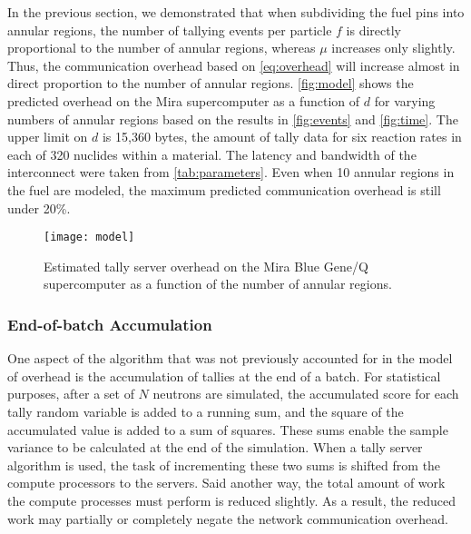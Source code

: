 \documentclass{snamc2013}
\begin{document}
In the previous section, we demonstrated that when subdividing the fuel pins
into annular regions, the number of tallying events per particle $f$ is directly
proportional to the number of annular regions, whereas $\mu$ increases only
slightly. Thus, the communication overhead based on \eqref{eq:overhead} will
increase almost in direct proportion to the number of annular
regions. \autoref{fig:model} shows the predicted overhead on the Mira
supercomputer as a function of $d$ for varying numbers of annular regions based
on the results in \autoref{fig:events} and \autoref{fig:time}. The upper limit
on $d$ is 15,360 bytes, the amount of tally data for six reaction rates in each
of 320 nuclides within a material. The latency and bandwidth of the interconnect
were taken from \autoref{tab:parameters}. Even when 10 annular regions in the
fuel are modeled, the maximum predicted communication overhead is still under
20\%.
\begin{figure}[htb]
  \centering
  \texttt{[image: model]}
  \caption{Estimated tally server overhead on the Mira Blue Gene/Q supercomputer
    as a function of the number of annular regions.}
  \label{fig:model}
\end{figure}

\subsubsection{End-of-batch Accumulation}
\label{sec:end-of-batch}

One aspect of the algorithm that was not previously accounted for in the model
of overhead is the accumulation of tallies at the end of a batch. For
statistical purposes, after a set of $N$ neutrons are simulated, the accumulated
score for each tally random variable is added to a running sum, and the square
of the accumulated value is added to a sum of squares. These sums enable the
sample variance to be calculated at the end of the simulation. When a tally
server algorithm is used, the task of incrementing these two sums is shifted
from the compute processors to the servers. Said another way, the total amount
of work the compute processes must perform is reduced slightly. As a result, the
reduced work may partially or completely negate the network communication
overhead.
\end{document}
